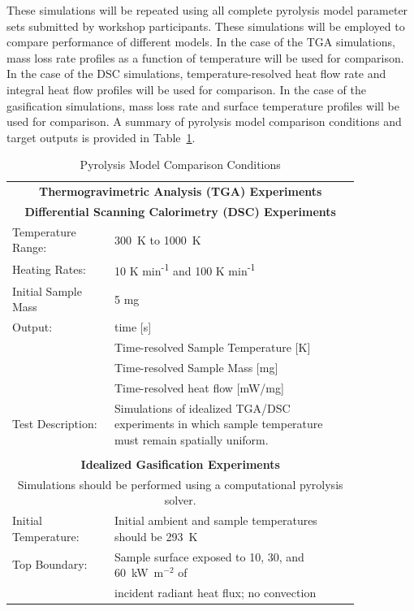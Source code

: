 \documentclass[12pt]{article}
\begin{document}
These simulations will be repeated using all complete pyrolysis model parameter sets submitted by workshop participants. These simulations will be employed to compare performance of different models. In the case of the TGA simulations, mass loss rate profiles as a function of temperature will be used for comparison. In the case of the DSC simulations, temperature-resolved heat flow rate and integral heat flow profiles will be used for comparison. In the case of the gasification simulations, mass loss rate and surface temperature profiles will be used for comparison. A summary of pyrolysis model comparison conditions and target outputs is provided in Table~\ref{table:Pyrolsis Model Comparison}.

\begin{table}[t!]
\centering
\caption{Pyrolysis Model Comparison Conditions}
\label{table:Pyrolsis Model Comparison}
\begin{tabular}{p{0.25\linewidth} p{0.6\linewidth}}
\hline
\multicolumn{2}{c}{\textbf{Thermogravimetric Analysis (TGA) Experiments} }\\
\multicolumn{2}{c}{\textbf{Differential Scanning Calorimetry (DSC) Experiments} }\\
\hline
Temperature Range: & 300~K to 1000~K\\
Heating Rates: & 10 K min\textsuperscript{-1} and 100 K min\textsuperscript{-1}\\
Initial Sample Mass & 5 mg\\
Output: & time [s]\\
& Time-resolved Sample Temperature [K]\\
& Time-resolved Sample Mass [mg]\\
& Time-resolved heat flow [mW/mg]\\
Test Description: & Simulations of idealized TGA/DSC experiments in which sample temperature must remain spatially uniform.\\
\\
\hline
\multicolumn{2}{c}{\textbf{Idealized Gasification Experiments}}\\
\multicolumn{2}{c}{Simulations should be performed using a computational pyrolysis solver.}\\
\hline
Initial Temperature: & Initial ambient and sample temperatures should be 293~K\\
Top Boundary:& Sample surface exposed to 10, 30, and 60~kW~m$^{-2}$ of\\
& incident radiant heat flux; no convection\\

\end{tabular}
\end{table}
\end{document}
